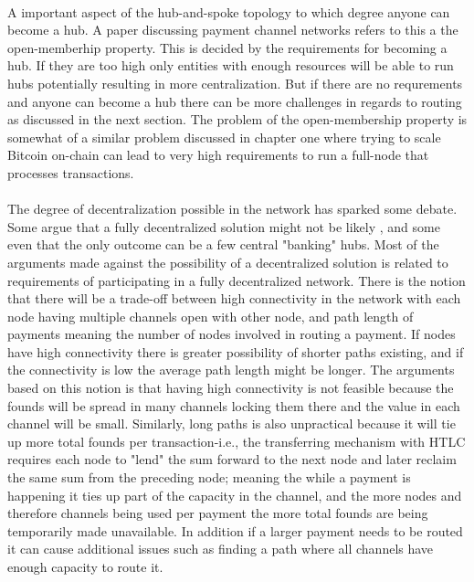 \documentclass[informationsecurity]{gucmasterproject}
\begin{document}
\paragraph{}
A important aspect of the hub-and-spoke topology to which degree anyone can become a hub.
A paper discussing payment channel networks\cite{mccorry2016towards} refers to this a the open-memberhip property.
This is decided by the requirements for becoming a hub. 
If they are too high only entities with enough resources will be able to run hubs potentially resulting in more centralization.
But if there are no requrements and anyone can become a hub there can be more challenges in regards to routing as discussed in the next section. The problem of the open-membership property is somewhat of a similar problem discussed in chapter one where trying to scale Bitcoin on-chain can lead to very high requirements to run a full-node that processes transactions. 

\paragraph{}
The degree of decentralization possible in the network has sparked some debate. Some argue that a fully decentralized solution might not be likely \cite{sceptic1}, and some even that the only outcome can be a few central "banking" hubs\cite{sceptic2}. Most of the arguments made against the possibility of a decentralized solution is related to requirements of participating in a fully decentralized network. There is the notion that there will be a trade-off between high connectivity in the network with each node having multiple channels open with other node, and path length of payments meaning the number of nodes involved in routing a payment. If nodes have high connectivity there is greater possibility of shorter paths existing, and if the connectivity is low the average path length might be longer.
The arguments based on this notion is  that having high connectivity is not feasible because the founds will be spread in many channels locking them there and the value in each channel will be small. Similarly, long paths is also unpractical because it will tie up more total founds per transaction-i.e., the transferring mechanism with HTLC requires each node to "lend" the sum forward to the next node and later reclaim the same sum from the preceding node; meaning the while a payment is happening it ties up part of the capacity in the channel, and the more nodes and therefore channels being used per payment the more total founds are being temporarily made unavailable.
In addition if a larger payment needs to be routed it can cause additional issues such as finding a path where all channels have enough capacity to route it.
\end{document}
